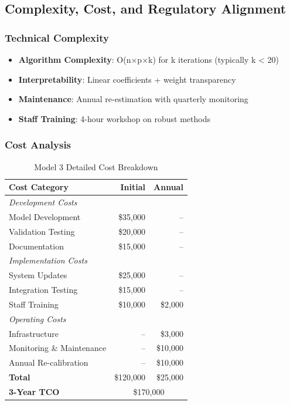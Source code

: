 \subsection{Complexity, Cost, and Regulatory Alignment}

\subsubsection{Technical Complexity}
\begin{itemize}
    \item \textbf{Algorithm Complexity}: O(n×p×k) for k iterations (typically k < 20)
    \item \textbf{Interpretability}: Linear coefficients + weight transparency
    \item \textbf{Maintenance}: Annual re-estimation with quarterly monitoring
    \item \textbf{Staff Training}: 4-hour workshop on robust methods
\end{itemize}

\subsubsection{Cost Analysis}

\begin{table}[h]
\centering
\caption{Model 3 Detailed Cost Breakdown}
\begin{tabular}{lrr}
\toprule
\textbf{Cost Category} & \textbf{Initial} & \textbf{Annual} \\
\midrule
\multicolumn{3}{l}{\textit{Development Costs}} \\
Model Development & \$35,000 & -- \\
Validation Testing & \$20,000 & -- \\
Documentation & \$15,000 & -- \\
\midrule
\multicolumn{3}{l}{\textit{Implementation Costs}} \\
System Updates & \$25,000 & -- \\
Integration Testing & \$15,000 & -- \\
Staff Training & \$10,000 & \$2,000 \\
\midrule
\multicolumn{3}{l}{\textit{Operating Costs}} \\
Infrastructure & -- & \$3,000 \\
Monitoring \& Maintenance & -- & \$10,000 \\
Annual Re-calibration & -- & \$10,000 \\
\midrule
\textbf{Total} & \$120,000 & \$25,000 \\
\textbf{3-Year TCO} & \multicolumn{2}{c}{\$170,000} \\
\bottomrule
\end{tabular}
\end{table}

